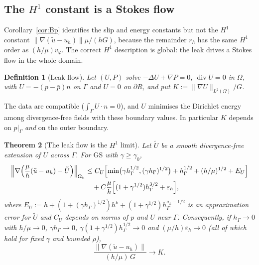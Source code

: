 \documentclass[pdflatex,sn-mathphys-num]{sn-jnl}
\theoremstyle{thmstyleone}
\newtheorem{theorem}{Theorem}[section]
\theoremstyle{thmstylethree}
\newtheorem{definition}[theorem]{Definition}
\newcommand{\hG}{h_\Gamma}
\newcommand{\Oh}{\Omega_h}
\newcommand{\ut}{\tilde u}
\newcommand{\pbar}{\bar p}
\newcommand{\norm}[1]{\lVert #1\rVert}
\newcommand{\GS}{\mathrm{GS}}
\newcommand{\eps}{\varepsilon_h}
\renewcommand{\div}{\operatorname{div}}
\begin{document}
\subsection{The \texorpdfstring{$H^1$}{H1} constant is a Stokes flow}\label{sec:leakflow}
Corollary~\ref{cor:Bp} identifies the slip and energy constants but not the $H^1$ constant $\norm{\nabla(\ut-u_h)}\mu/(hG)$, because the remainder $r_h$ has the same $H^1$ order as $(h/\mu)v_\varphi$. The correct $H^1$ description is global: the leak drives a Stokes flow in the whole domain.

\begin{definition}[Leak flow]\label{def:leak}
Let $(U,P)$ solve $-\Delta U+\nabla P=0$, $\div U=0$ in $\Omega$, with $U=-(p-\pbar)n$ on $\Gamma$ and $U=0$ on $\partial R$, and put $K:=\norm{\nabla U}_{L^2(\Omega)}/G$.
\end{definition}

The data are compatible ($\int_\Gamma U\cdot n=0$), and $U$ minimises the Dirichlet energy among divergence-free fields with these boundary values. In particular $K$ depends on $p|_\Gamma$ \emph{and} on the outer boundary.

\begin{theorem}[The leak flow is the $H^1$ limit]\label{thm:hc}
Let $\tilde U$ be a smooth divergence-free extension of $U$ across $\Gamma$. For $\GS$ with $\gamma\ge\gamma_0$,
\[
\begin{aligned}
\Bigl\|\nabla\Bigl(\frac\mu h(\ut-u_h)-\tilde U\Bigr)\Bigr\|_{\Oh}&\le C_U\Bigl[\min\bigl(\gamma\hG^{1/2},(\gamma\hG)^{1/2}\bigr)+\hG^{1/2}+(h/\mu)^{1/2}+E_U\Bigr]\\
&\quad+C\frac\mu h\Bigl[(1+\gamma^{1/2})\hG^{3/2}+\eps\Bigr],
\end{aligned}
\]
where $E_U:=h+(1+(\gamma\hG)^{1/2})h^k+(1+\gamma^{1/2})\hG^{\sigma_k-1/2}$ is an approximation error for $\tilde U$ and $C_U$ depends on norms of $p$ and $U$ near $\Gamma$.
Consequently, if $\hG\to0$ with $h/\mu\to0$, $\gamma\hG\to0$, $\gamma(1+\gamma^{1/2})\hG^{1/2}\to0$ and $(\mu/h)\eps\to0$ (all of which hold for fixed $\gamma$ and bounded $\rho$),
\[
\frac{\norm{\nabla(\ut-u_h)}}{(h/\mu)\,G}\longrightarrow K .
\]
\end{theorem}
\end{document}
